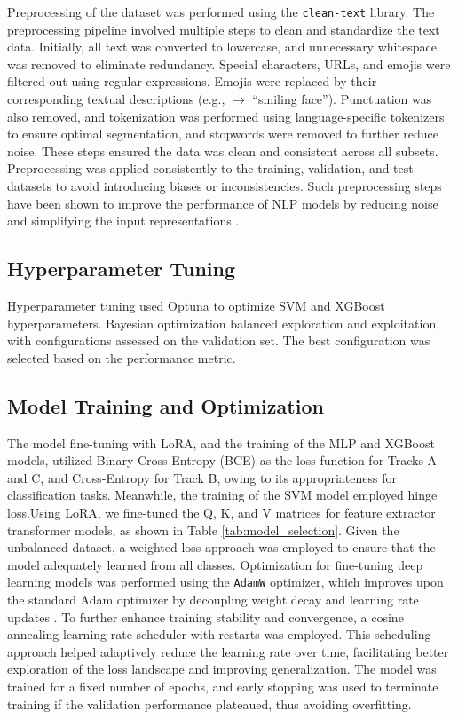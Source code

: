 Preprocessing of the dataset was performed using the \texttt{clean-text} library. The preprocessing pipeline involved multiple steps to clean and standardize the text data. Initially, all text was converted to lowercase, and unnecessary whitespace was removed to eliminate redundancy. Special characters, URLs, and emojis were filtered out using regular expressions. Emojis were replaced by their corresponding textual descriptions (e.g., \smiley $\rightarrow$ ``smiling face''). Punctuation was also removed, and  tokenization was performed using language-specific tokenizers to ensure optimal segmentation, and stopwords were removed to further reduce noise. These steps ensured the data was clean and consistent across all subsets. Preprocessing was applied consistently to the training, validation, and test datasets to avoid introducing biases or inconsistencies. Such preprocessing steps have been shown to improve the performance of NLP models by reducing noise and simplifying the input representations \citep{Zhang2020DataPrep}.

\subsection{Hyperparameter Tuning}

Hyperparameter tuning used Optuna \citep{Akiba2019Optuna} to optimize SVM and XGBoost hyperparameters. Bayesian optimization balanced exploration and exploitation, with configurations assessed on the validation set. The best configuration was selected based on the performance metric.

\subsection{Model Training and Optimization}

The model fine-tuning with LoRA, and the training of the MLP and XGBoost models, utilized Binary Cross-Entropy (BCE) as the loss function for Tracks A and C, and Cross-Entropy for Track B, owing to its appropriateness for classification tasks. Meanwhile, the training of the SVM model employed hinge loss.Using LoRA, we fine-tuned the Q, K, and V matrices for feature extractor transformer models, as shown in Table \ref{tab:model_selection}. Given the unbalanced dataset, a weighted loss approach was employed to ensure that the model adequately learned from all classes. Optimization for fine-tuning deep learning models was performed using the \texttt{AdamW} optimizer, which improves upon the standard Adam optimizer by decoupling weight decay and learning rate updates \citep{Loshchilov2019AdamW}. To further enhance training stability and convergence, a cosine annealing learning rate scheduler with restarts\cite{loshchilov2017sgdrstochasticgradientdescent} was employed. This scheduling approach helped adaptively reduce the learning rate over time, facilitating better exploration of the loss landscape and improving generalization. The model was trained for a fixed number of epochs, and early stopping was used to terminate training if the validation performance plateaued, thus avoiding overfitting.


